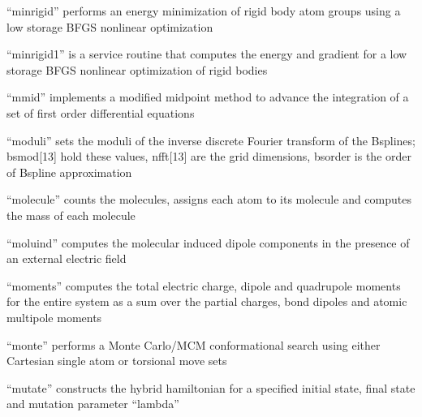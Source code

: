 \documentclass[letterpaper,11pt,english]{sphinxmanual}
\begin{document}

“minrigid” performs an energy minimization of rigid body atom groups using a low storage BFGS nonlinear optimization


“minrigid1” is a service routine that computes the energy and gradient for a low storage BFGS nonlinear optimization of rigid bodies


“mmid” implements a modified midpoint method to advance the integration of a set of first order differential equations






“moduli” sets the moduli of the inverse discrete Fourier transform of the B\sphinxhyphen{}splines; bsmod{[}1\sphinxhyphen{}3{]} hold these values, nfft{[}1\sphinxhyphen{}3{]} are the grid dimensions, bsorder is the order of B\sphinxhyphen{}spline approximation


“molecule” counts the molecules, assigns each atom to its molecule and computes the mass of each molecule


“moluind” computes the molecular induced dipole components in the presence of an external electric field


“moments” computes the total electric charge, dipole and quadrupole moments for the entire system as a sum over the partial charges, bond dipoles and atomic multipole moments


“monte” performs a Monte Carlo/MCM conformational search using either Cartesian single atom or torsional move sets


“mutate” constructs the hybrid hamiltonian for a specified initial state, final state and mutation parameter “lambda”
\end{document}
